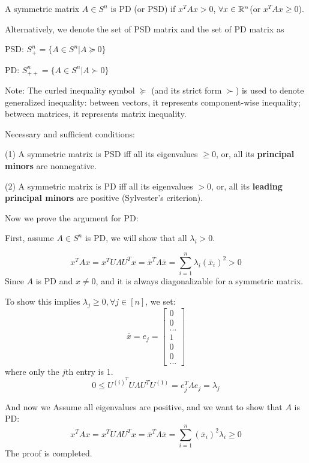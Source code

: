 \begin{definition}
	A symmetric matrix $A\in S^n$ is PD (or PSD) if $x^TAx > 0$, $\forall x\in \mathbb{R}^n$(or $x^TAx\geq 0$).
\end{definition}

Alternatively, we denote the set of PSD matrix and the set of PD matrix as

PSD: $S^n_{+} = \{A\in S^n | A\succeq 0\}$

PD: $S^n_{++} = \{A\in S^n | A\succ 0\}$

Note: The curled inequality symbol $\succeq$ (and its strict form $\succ$) is used to denote generalized inequality: between vectors, it represents component-wise inequality; between matrices, it represents matrix inequality.

\vspace{0.3cm}
Necessary and sufficient conditions:

(1) A symmetric matrix is PSD iff all its eigenvalues $\geq 0$, or, all its \textbf{principal minors} are nonnegative.

(2) A symmetric matrix is PD iff all its eigenvalues $> 0$, or, all its \textbf{leading principal minors} are positive (Sylvester's criterion).

\vspace{0.3cm}
Now we prove the argument for PD:

First, assume $A\in S^n$ is PD, we will show that all $\lambda_i > 0$. 

\begin{equation*}
x^TAx = x^TU\Lambda U^Tx = \bar{x}^T\Lambda\bar{x} = \sum^n_{i=1}\lambda_i(\bar{x}_i)^2 >0
\end{equation*}
Since $A$ is PD and $x\neq 0$, and it is always diagonalizable for a symmetric matrix.

To show this implies $\lambda_j \geq 0, \forall j\in [n]$, we set:
$$\bar{x} = e_j = 
\left[
\begin{matrix}
0\\
0\\
...\\
1\\
0\\
0\\
...
\end{matrix}
\right]
$$
where only the $j$th entry is 1.
$$0 \leq U^{(i)^T} U\Lambda U^TU^{(1)} =e_j^T\Lambda e_j = \lambda_j$$

And now we Assume all eigenvalues are positive, and we want to show that $A$ is PD:
$$x^TAx =x^TU\Lambda U^Tx = \bar{x}^T\Lambda \bar{x} = \sum^n_{i=1}(\bar{x}_i)^2\lambda_i \geq 0$$
The proof is completed.

